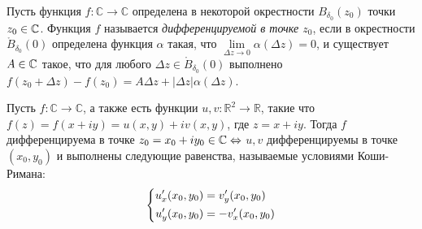 \begin{definition}
	Пусть функция $f:\mathbb{C} \to \mathbb{C}$ определена в некоторой окрестности $B_{\delta_0}(z_0)$ точки  $z_0 \in \mathbb{C}$. Функция $f$ называется \textit{дифференцируемой в точке $z_0$}, если в окрестности $\mathring B_{\delta_0}{(0)}$ определена функция $\alpha$ такая, что $\lim\limits_{\Delta z \to 0}\alpha(\Delta z) = 0$, и существует $A \in \mathbb{C}$ такое, что для любого $\Delta z \in \mathring B_{\delta_0}{(0)}$ выполнено $f(z_0 + \Delta z) - f(z_0) = A\Delta z + |\Delta z|\alpha(\Delta z)$.
\end{definition}

\begin{theorem}
	Пусть $f: \mathbb{C} \to \mathbb{C}$, а также есть функции \(u, v: \mathbb{R}^2 \to \mathbb{R}\), такие что $f(z) = f(x + iy) = u(x, y) + iv(x, y)$, где \(z = x + iy\). Тогда $f$ дифференцируема в точке $z_0 = x_0 + iy_0 \in \mathbb{C} \Leftrightarrow$ $u, v$ дифференцируемы в точке $(x_0, y_0)$ и выполнены следующие равенства, называемые условиями Коши-Римана:
	\[\left\{\begin{aligned}u'_x(x_0, y_0) &= v'_y(x_0, y_0) \\ u'_y(x_0, y_0) &= -v'_x(x_0, y_0)\end{aligned}\right.\]
\end{theorem}

